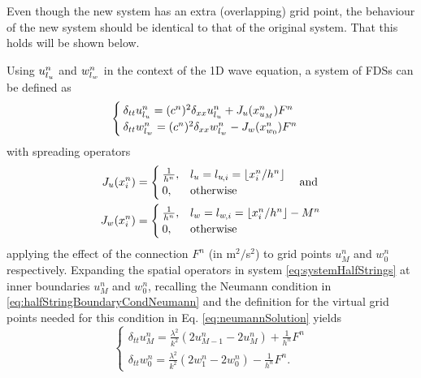 Even though the new system has an extra (overlapping) grid point, the behaviour of the new system should be identical to that of the original system. That this holds will be shown below. 

Using $u_{l_u}^n$ and $w_{l_w}^n$ in the context of the 1D wave equation, a system of FDSs can be defined as
\begin{equation}
    \begin{cases}\label{eq:systemHalfStrings}
        \delta_{tt}u_{l_u}^n = (c^n)^2\delta_{xx}u_{l_u}^n + J_u(x_{u_M}^n)F^n\\
        \delta_{tt}w_{l_w}^n = (c^n)^2\delta_{xx}w_{l_w}^n - J_w(x_{w_0}^n)F^n
    \end{cases}
\end{equation}
 with spreading operators
\begin{equation}\label{eq:spreadingOperators}
    \begin{aligned}
    J_u(x_i^n)& =
    \begin{cases}
        \frac{1}{h^n}, & {l_u} = {l_u}_{\!,i} = \lfloor x_i^n/h^n\rfloor\\
        0,& \text{otherwise}
    \end{cases}
    \quad\text{and}\\
    J_w(x_i^n) &=
    \begin{cases}
        \frac{1}{h^n}, & {l_w} = {l_w}_{\!,i} = \lfloor x_i^n/h^n \rfloor - M^n\\
        0,& \text{otherwise}
    \end{cases}
\end{aligned}
\end{equation}
 applying the effect of the connection %
$F^n$ (in m$^2/$s$^2$) to grid points $u_M^n$ and $w_0^n$ respectively.
%
Expanding the spatial operators in system \eqref{eq:systemHalfStrings} at inner boundaries $u_M^n$ and $w_0^n$, recalling the Neumann condition in  \eqref{eq:halfStringBoundaryCondNeumann} and the definition for the virtual grid points needed for this condition in Eq. \eqref{eq:neumannSolution} yields
\begin{equation}\label{eq:expandedSystem}
    \begin{cases}
        \delta_{tt}u_M^n = \frac{\lambda^2}{k^2}(2u_{M-1}^n-2u_M^n) + \frac{1}{h^n}F^n\\
        \delta_{tt}w_0^n = \frac{\lambda^2}{k^2}(2w_1^n-2w_0^n) - \frac{1}{h^n}F^n.
    \end{cases}
\end{equation}

